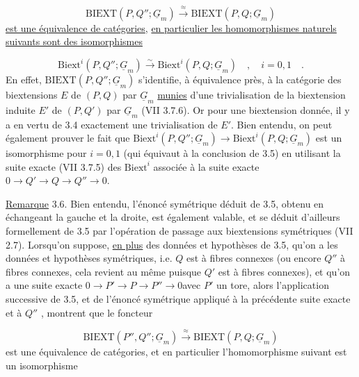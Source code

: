 \begin{equation}\tag{3.5.1}
\mathrm{BIEXT}(P,Q''; \underline{G}_m) \stackrel{\approx}{\longrightarrow} \mathrm{BIEXT}(P,Q;\underline{G}_m)
\end{equation}
\underline{est une équivalence de catégories}, \underline{en particulier les homomorphismes naturels suivants sont des isomorphismes}

\begin{equation}\tag{3.5.2}
\mathrm{Biext}^i(P,Q''; \underline{G}_m) \stackrel{\sim}{\longrightarrow} \mathrm{Biext}^i(P,Q; \underline{G}_m) \quad , \quad i = 0,1 \quad .
\end{equation}
En effet, $\mathrm{BIEXT}(P,Q'';\underline{G}_m)$ s'identifie, à équivalence près, à la catégorie des biextensions $E$ de $(P,Q)$ par $\underline{G}_m$ \underline{munies} d'une trivialisation de la biextension induite $E'$ de $(P,Q')$ par $\underline{G}_m$ (VII 3.7.6\quad ). Or pour une biextension donnée, il y a en vertu de 3.4 exactement une trivialisation de $E'$. Bien entendu, on peut également prouver le fait
que $\mathrm{Biext}^i(P,Q'';\underline{G}_m) \longrightarrow \mathrm{Biext}^i(P,Q;\underline{G}_m)$ est un isomorphisme pour $i = 0,1$ (qui équivaut à la conclusion de 3.5) en utilisant la suite exacte (VII 3.7.5\quad ) des $\mathrm{Biext}^i$ associée à la suite exacte $0 \to Q' \to Q \to Q'' \to 0$.

\underline{Remarque} 3.6. Bien entendu, l'énoncé symétrique déduit de 3.5, obtenu en échangeant la gauche et la droite, est également valable, et se déduit d'ailleurs formellement de 3.5 par l'opération de passage aux biextensions symétriques (VII 2.7\quad ). Lorsqu'on suppose, \underline{en plus} des données et hypothèses de 3.5, qu'on a les données et hypothèses symétriques, i.e. $Q$ est à fibres connexes (ou encore $Q''$ à fibres connexes, cela revient au même puisque $Q'$ est à fibres connexes), et qu'on a une suite exacte $0 \longrightarrow P' \longrightarrow P \longrightarrow P'' \longrightarrow 0$\quad avec $P'$ un tore, alors l'application successive de 3.5, et de l'énoncé symétrique appliqué à la précédente suite exacte et à $Q''$ , montrent que le foncteur

\begin{equation}\tag{3.6.1}
\mathrm{BIEXT}(P'',Q''; \underline{G}_m) \stackrel{\approx}{\longrightarrow} \mathrm{BIEXT}(P,Q;\underline{G}_m)
\end{equation}
est une équivalence de catégories, et en particulier l'homomorphisme suivant est un isomorphisme

